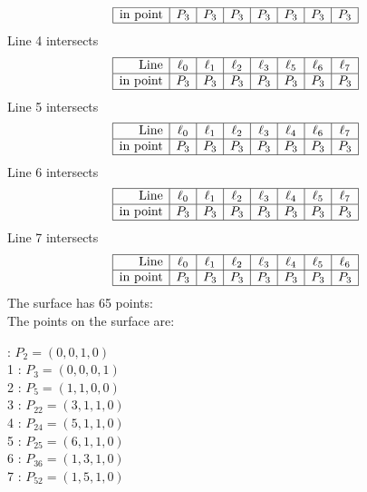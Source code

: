 \documentclass{article}
\begin{document}
{$$\begin{array}{|r*{7}{|c}|}
\hline
\mbox{in point}  & P_{3} & P_{3} & P_{3} & P_{3} & P_{3} & P_{3} & P_{3}\\
\hline
\end{array}
$$
Line 4 intersects 
$$
\begin{array}{|r*{7}{|c}|}
\hline
\mbox{Line}  & \ell_{0} & \ell_{1} & \ell_{2} & \ell_{3} & \ell_{5} & \ell_{6} & \ell_{7}\\
\hline
\mbox{in point}  & P_{3} & P_{3} & P_{3} & P_{3} & P_{3} & P_{3} & P_{3}\\
\hline
\end{array}
$$
Line 5 intersects 
$$
\begin{array}{|r*{7}{|c}|}
\hline
\mbox{Line}  & \ell_{0} & \ell_{1} & \ell_{2} & \ell_{3} & \ell_{4} & \ell_{6} & \ell_{7}\\
\hline
\mbox{in point}  & P_{3} & P_{3} & P_{3} & P_{3} & P_{3} & P_{3} & P_{3}\\
\hline
\end{array}
$$
Line 6 intersects 
$$
\begin{array}{|r*{7}{|c}|}
\hline
\mbox{Line}  & \ell_{0} & \ell_{1} & \ell_{2} & \ell_{3} & \ell_{4} & \ell_{5} & \ell_{7}\\
\hline
\mbox{in point}  & P_{3} & P_{3} & P_{3} & P_{3} & P_{3} & P_{3} & P_{3}\\
\hline
\end{array}
$$
Line 7 intersects 
$$
\begin{array}{|r*{7}{|c}|}
\hline
\mbox{Line}  & \ell_{0} & \ell_{1} & \ell_{2} & \ell_{3} & \ell_{4} & \ell_{5} & \ell_{6}\\
\hline
\mbox{in point}  & P_{3} & P_{3} & P_{3} & P_{3} & P_{3} & P_{3} & P_{3}\\
\hline
\end{array}
$$
The surface has 65 points:\\
The points on the surface are:\\
\begin{multicols}{3}
 : $P_{2}=( 0, 0, 1, 0 )$\\
1 : $P_{3}=( 0, 0, 0, 1 )$\\
2 : $P_{5}=( 1, 1, 0, 0 )$\\
3 : $P_{22}=( 3, 1, 1, 0 )$\\
4 : $P_{24}=( 5, 1, 1, 0 )$\\
5 : $P_{25}=( 6, 1, 1, 0 )$\\
6 : $P_{36}=( 1, 3, 1, 0 )$\\
7 : $P_{52}=( 1, 5, 1, 0 )$\\

\end{multicols}}
\end{document}
